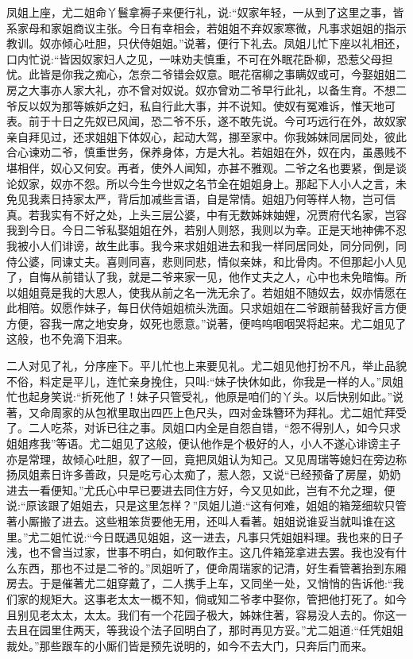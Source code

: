 \begin{parag}
    凤姐上座，尤二姐命丫鬟拿褥子来便行礼，说:“奴家年轻，一从到了这里之事，皆系家母和家姐商议主张。今日有幸相会，若姐姐不弃奴家寒微，凡事求姐姐的指示教训。奴亦倾心吐胆，只伏侍姐姐。”说著，便行下礼去。凤姐儿忙下座以礼相还，口内忙说:“皆因奴家妇人之见，一味劝夫慎重，不可在外眠花卧柳，恐惹父母担忧。此皆是你我之痴心，怎奈二爷错会奴意。眠花宿柳之事瞒奴或可，今娶姐姐二房之大事亦人家大礼，亦不曾对奴说。奴亦曾劝二爷早行此礼，以备生育。不想二爷反以奴为那等嫉妒之妇，私自行此大事，并不说知。使奴有冤难诉，惟天地可表。前于十日之先奴已风闻，恐二爷不乐，遂不敢先说。今可巧远行在外，故奴家亲自拜见过，还求姐姐下体奴心，起动大驾，挪至家中。你我姊妹同居同处，彼此合心谏劝二爷，慎重世务，保养身体，方是大礼。若姐姐在外，奴在内，虽愚贱不堪相伴，奴心又何安。再者，使外人闻知，亦甚不雅观。二爷之名也要紧，倒是谈论奴家，奴亦不怨。所以今生今世奴之名节全在姐姐身上。那起下人小人之言，未免见我素日持家太严，背后加减些言语，自是常情。姐姐乃何等样人物，岂可信真。若我实有不好之处，上头三层公婆，中有无数姊妹妯娌，况贾府代名家，岂容我到今日。今日二爷私娶姐姐在外，若别人则怒，我则以为幸。正是天地神佛不忍我被小人们诽谤，故生此事。我今来求姐姐进去和我一样同居同处，同分同例，同侍公婆，同谏丈夫。喜则同喜，悲则同悲，情似亲妹，和比骨肉。不但那起小人见了，自悔从前错认了我，就是二爷来家一见，他作丈夫之人，心中也未免暗悔。所以姐姐竟是我的大恩人，使我从前之名一洗无余了。若姐姐不随奴去，奴亦情愿在此相陪。奴愿作妹子，每日伏侍姐姐梳头洗面。只求姐姐在二爷跟前替我好言方便方便，容我一席之地安身，奴死也愿意。”说著，便呜呜咽咽哭将起来。尤二姐见了这般，也不免滴下泪来。
\end{parag}


\begin{parag}
    二人对见了礼，分序座下。平儿忙也上来要见礼。尤二姐见他打扮不凡，举止品貌不俗，料定是平儿，连忙亲身挽住，只叫:“妹子快休如此，你我是一样的人。”凤姐忙也起身笑说:“折死他了！妹子只管受礼，他原是咱们的丫头。以后快别如此。”说著，又命周家的从包袱里取出四匹上色尺头，四对金珠簪环为拜礼。尤二姐忙拜受了。二人吃茶，对诉已往之事。凤姐口内全是自怨自错，“怨不得别人，如今只求姐姐疼我”等语。尤二姐见了这般，便认他作是个极好的人，小人不遂心诽谤主子亦是常理，故倾心吐胆，叙了一回，竟把凤姐认为知己。又见周瑞等媳妇在旁边称扬凤姐素日许多善政，只是吃亏心太痴了，惹人怨，又说“已经预备了房屋，奶奶进去一看便知。”尤氏心中早已要进去同住方好，今又见如此，岂有不允之理，便说:“原该跟了姐姐去，只是这里怎样？”凤姐儿道:“这有何难，姐姐的箱笼细软只管著小厮搬了进去。这些粗笨货要他无用，还叫人看著。姐姐说谁妥当就叫谁在这里。”尤二姐忙说:“今日既遇见姐姐，这一进去，凡事只凭姐姐料理。我也来的日子浅，也不曾当过家，世事不明白，如何敢作主。这几件箱笼拿进去罢。我也没有什么东西，那也不过是二爷的。”凤姐听了，便命周瑞家的记清，好生看管著抬到东厢房去。于是催著尤二姐穿戴了，二人携手上车，又同坐一处，又悄悄的告诉他:“我们家的规矩大。这事老太太一概不知，倘或知二爷孝中娶你，管把他打死了。如今且别见老太太，太太。我们有一个花园子极大，姊妹住著，容易没人去的。你这一去且在园里住两天，等我设个法子回明白了，那时再见方妥。”尤二姐道:“任凭姐姐裁处。”那些跟车的小厮们皆是预先说明的，如今不去大门，只奔后门而来。
\end{parag}


